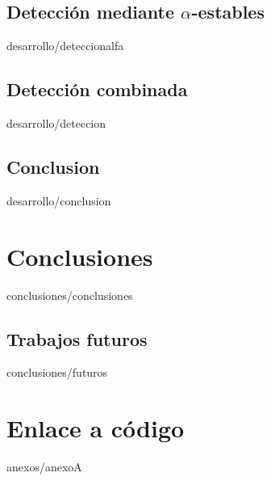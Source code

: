 \documentclass[epsbased,copyright,final,printable,covers,extendedindex,firstnumbered,tfg,gnuplot]{tfgtfmthesisuam}
\begin{document}
  \section{Detección mediante $\alpha$-estables\label{SEC:DETECCIONALFA}}{desarrollo/deteccionalfa}
  \section{Detección combinada\label{SEC:DETECCION}}{desarrollo/deteccion}
  \section{Conclusion\label{SEC:DPCONCLUSION}}{desarrollo/conclusion}
\chapter{Conclusiones\label{CAP:CONCLUSIONES}}{conclusiones/conclusiones}
  \section{Trabajos futuros\label{SEC:FUTUROS}}{conclusiones/futuros}

\appendix

\chapter{Enlace a código\label{CAP:ANEXOA}}{anexos/anexoA}
\end{document}
